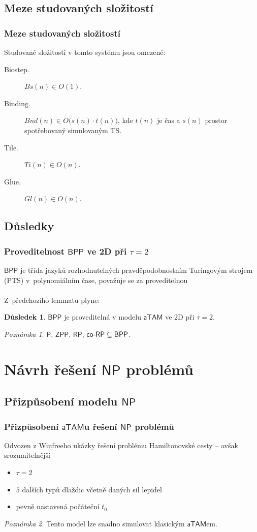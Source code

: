\documentclass[10pt]{beamer}
\renewcommand{\P}{\mathsf{P}}
\newcommand{\NP}{\mathsf{NP}}
\newcommand{\RP}{\mathsf{RP}}
\newcommand{\coRP}{\mathsf{co}\textnormal{-}\mathsf{RP}}
\newcommand{\BPP}{\mathsf{BPP}}
\newcommand{\ZPP}{\mathsf{ZPP}}
\newcommand{\atam}{\mathsf{aTAM}}
\theoremstyle{definition}
\newtheorem{dusl}[tvr]{Důsledek}
\theoremstyle{remark}
\newtheorem{pozn}{Poznámka}
\begin{document}
\subsection{Meze studovaných složitostí}
\begin{frame}
\frametitle{Meze studovaných složitostí}
	\begin{lemma}
		Studované složitosti v tomto systému jsou omezené:
		\begin{description}
			\item[Biostep.] $Bs(n) \in O(1)$.
			\item[Binding.] $Bnd(n) \in O\bigl(s(n)\cdot t(n)\bigr)$, kde $t(n)$ je čas a $s(n)$ prostor spotřebovaný simulovaným TS.
			\item[Tile.] $Ti(n) \in O(n)$.
			\item[Glue.] $Gl(n) \in O(n)$.
		\end{description}
	\end{lemma}
\end{frame}

\subsection{Důsledky}
\begin{frame}
\frametitle{Proveditelnost $\BPP$ ve 2D při $\tau=2$}
	$\BPP$ je třída jazyků rozhodnutelných pravděpodobnostním Turingovým strojem (PTS) v~polynomiálním čase, považuje se za proveditelnou\\
	~\\
	Z~předchozího lemmatu plyne:
	\begin{dusl}
		$\BPP$ je proveditelná v modelu $\atam$ ve 2D při $\tau=2$.
	\end{dusl}
	\begin{pozn}
		$\P$, $\ZPP$, $\RP$, $\coRP \subseteq \BPP$.
	\end{pozn}
\end{frame}

\section{Návrh řešení $\NP$ problémů}
\subsection{Přizpůsobení modelu $\NP$}
\begin{frame}
\frametitle{Přizpůsobení $\atam$u řešení $\NP$ problémů}
	Odvozen z Winfreeho ukázky řešení problému Hamiltonovské cesty -- avšak srozumitelnější
	\begin{itemize}
		\item $\tau=2$
		\item $5$ dalších typů dlaždic včetně daných sil lepidel
		\item pevně nastavená počáteční $t_0$
	\end{itemize}
	\begin{pozn}
		Tento model lze snadno simulovat klasickým $\atam$em.
	\end{pozn}
\end{frame}
\end{document}
